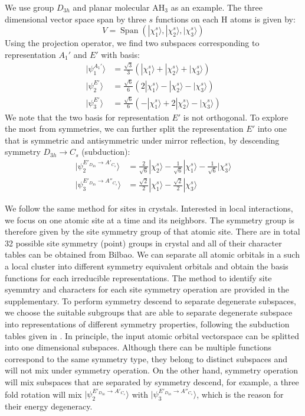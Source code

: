 \documentclass{article}
\DeclareMathOperator{\spn}{Span}
\begin{document}
We use group $D_{3h}$ and planar molecular AH$_3$ as an example. The 
three dimensional vector space span by three $s$ functions on each H atoms
is given by:
\begin{equation}
    V = \spn(|\chi^s_{1}\rangle, |\chi^s_2\rangle, |\chi^s_3\rangle)
\end{equation}
Using the projection operator, we find two subspaces corresponding to representation $A_1'$ 
and $E'$ with basis:
\begin{align}
    | \psi_1^{A_1'} \rangle &= \frac{\sqrt{3}}{3} (|\chi^s_1\rangle + |\chi^s_2\rangle + |\chi^s_3\rangle) \\
    |\psi_2^{E'}\rangle   &= \frac{\sqrt{6}}{6}( 2|\chi^s_1\rangle - |\chi^s_2\rangle - |\chi^s_3\rangle) \\
    |\psi_3^{E'}\rangle   &= \frac{\sqrt{6}}{6}(- |\chi^s_1\rangle + 2|\chi^s_2\rangle - |\chi^s_3\rangle)
\end{align}
We note that the two basis for representation $E'$ is not orthogonal.
To explore the most from symmetries, we can further split the representation $E'$ into one
that is symmetric and antisymmetric under mirror reflection, by descending symmetry $D_{3h}\to C_s$ (subduction):
\begin{align}
    |\psi_2^{E'_{D_{3h}}\to A'_{C_s}} \rangle &= \frac{2}{\sqrt{6}} |\chi^s_2\rangle - \frac{1}{\sqrt{6}} |\chi^s_1\rangle - \frac{1}{\sqrt{6}} |\chi^s_3\rangle \\
    |\psi_3^{E'_{D_{3h}}\to A''_{C_s}}\rangle &= \frac{\sqrt{2}}{2} |\chi^s_1\rangle - \frac{\sqrt{2}}{2} |\chi^s_3\rangle
\end{align}

We follow the same method for sites in crystals. Interested in local interactions, we focus on one atomic site at a time and its neighbors. 
The symmetry group is therefore given by the site symmetry group of that atomic site. 
There are in total 32 possible site symmetry (point) groups in crystal and all of their character tables can be obtained from Bilbao. 
We can separate all atomic orbitals in a such a local cluster into different symmetry equivalent orbitals and obtain the basis functions 
for each irreducible representations. 
The method to identify site syemmtry and characters for each site symmetry operation are provided in the supplementary. 
To perform symmetry descend to separate degenerate subspaces, we choose the suitable subgroups that are able to separate degenerate 
subspace into representations of different symmetry properties, following the subduction tables 
given in \cite{altmann_point-group_1994}. In principle, the input atomic orbital vectorspace can be splitted into 
one dimensional subspaces. Although there can be multiple functions correspond to the same symmetry type, they belong to distinct 
subspaces and will not mix under symmetry operation. On the other hand, symmetry operation will mix subspaces that are separated 
by symmetry descend, for example, a three fold rotation will mix $|\psi_2^{E'_{D_{3h}}\to A'_{C_s}} \rangle$ with 
$|\psi_3^{E'_{D_{3h}}\to A''_{C_s}}\rangle$, which is the reason for their energy degeneracy.
\end{document}
